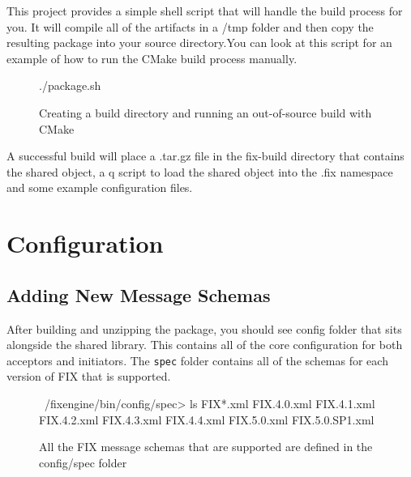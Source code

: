 \begin{figure}[H]
\end{figure}

This project provides a simple shell script that will handle the build process for you. It will compile all of the artifacts in a /tmp folder and then copy the resulting package into
your source directory.You can look at this script for an example of how to run the CMake build
process manually.

\begin{figure}[H]
\begin{bashcode}
./package.sh
\end{bashcode}
\caption{Creating a build directory and running an out-of-source build with CMake}
\end{figure}

A successful build will place a .tar.gz file in the fix-build directory that contains the shared object, a q script to load the shared object into the .fix namespace and some example configuration files.

\section{Configuration}
\subsection{Adding New Message Schemas}

After building and unzipping the package, you should see config folder that sits
alongside the shared library. This contains all of the core configuration for both acceptors
and initiators. The \verb|spec| folder contains all of the schemas for each version of FIX that is supported.

\begin{figure}[H]
\begin{qcode}
~/fixengine/bin/config/spec> ls FIX*.xml
FIX.4.0.xml
FIX.4.1.xml
FIX.4.2.xml
FIX.4.3.xml
FIX.4.4.xml
FIX.5.0.xml
FIX.5.0.SP1.xml
\end{qcode}
\caption{All the FIX message schemas that are supported are defined in the config/spec folder}
\end{figure}

